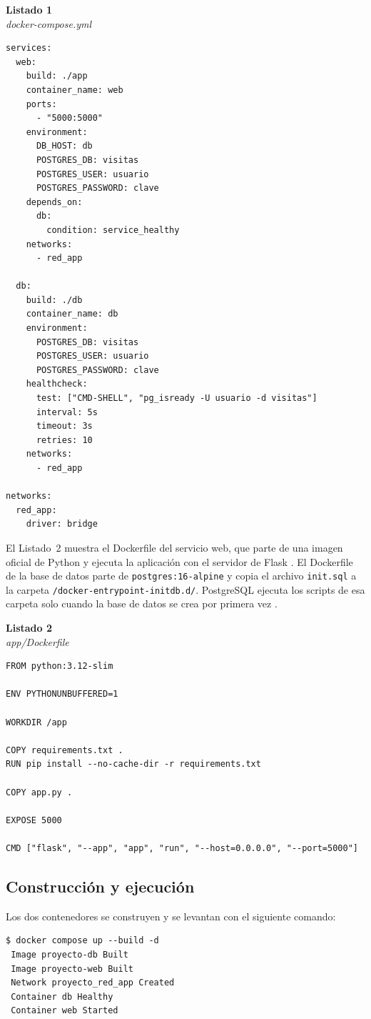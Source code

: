 \documentclass[stu,a4paper,floatsintext]{apa7}
\begin{document}
\noindent\textbf{Listado 1}\\
\textit{docker-compose.yml}
\begin{lstlisting}
services:
  web:
    build: ./app
    container_name: web
    ports:
      - "5000:5000"
    environment:
      DB_HOST: db
      POSTGRES_DB: visitas
      POSTGRES_USER: usuario
      POSTGRES_PASSWORD: clave
    depends_on:
      db:
        condition: service_healthy
    networks:
      - red_app

  db:
    build: ./db
    container_name: db
    environment:
      POSTGRES_DB: visitas
      POSTGRES_USER: usuario
      POSTGRES_PASSWORD: clave
    healthcheck:
      test: ["CMD-SHELL", "pg_isready -U usuario -d visitas"]
      interval: 5s
      timeout: 3s
      retries: 10
    networks:
      - red_app

networks:
  red_app:
    driver: bridge
\end{lstlisting}

El Listado~2 muestra el Dockerfile del servicio web, que parte de una imagen oficial de Python y ejecuta la aplicación con el servidor de Flask \parencite{pallets_flask}. El Dockerfile de la base de datos parte de \texttt{postgres:16-alpine} y copia el archivo \texttt{init.sql} a la carpeta \texttt{/docker-entrypoint-initdb.d/}. PostgreSQL ejecuta los scripts de esa carpeta solo cuando la base de datos se crea por primera vez \parencite{dockerinc_postgres}.

\noindent\textbf{Listado 2}\\
\textit{app/Dockerfile}
\begin{lstlisting}
FROM python:3.12-slim

ENV PYTHONUNBUFFERED=1

WORKDIR /app

COPY requirements.txt .
RUN pip install --no-cache-dir -r requirements.txt

COPY app.py .

EXPOSE 5000

CMD ["flask", "--app", "app", "run", "--host=0.0.0.0", "--port=5000"]
\end{lstlisting}

\subsection{Construcción y ejecución}

Los dos contenedores se construyen y se levantan con el siguiente comando:

\begin{lstlisting}
$ docker compose up --build -d
 Image proyecto-db Built
 Image proyecto-web Built
 Network proyecto_red_app Created
 Container db Healthy
 Container web Started
\end{lstlisting}
\end{document}
